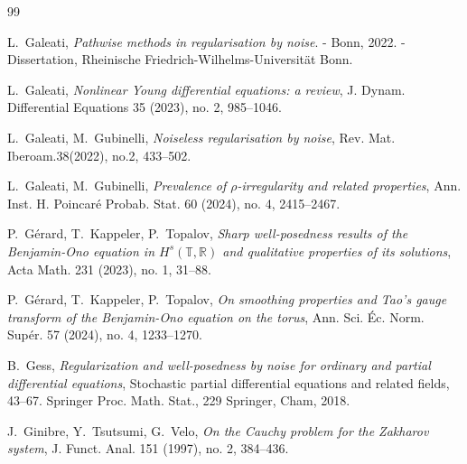 \documentclass[letterpaper, 11pt,  reqno]{amsart}
\newcommand{\1}{\hspace{0.5mm}\text{I}\hspace{0.5mm}}
\newcommand{\R}{\mathbb{R}}
\newcommand{\T}{\mathbb{T}}
\numberwithin{equation}{section}
\numberwithin{theorem}{section}
\begin{document}
\begin{thebibliography}{99}
%
%

L.~Galeati, 
{\it Pathwise methods in regularisation by noise}. - Bonn, 2022. - Dissertation, 
Rheinische Friedrich-Wilhelms-Universit\"at Bonn. 

L.~Galeati, 
{\it Nonlinear {Y}oung differential equations: a review}, 
J. Dynam. Differential Equations 35 (2023), no. 2, 985--1046.



L.~Galeati, M.~Gubinelli,
{\it Noiseless regularisation by noise}, 
Rev. Mat. Iberoam.38(2022), no.2, 433--502.




L.~Galeati, M.~Gubinelli,
{\it  Prevalence of $\rho$-irregularity and related properties},
 Ann. Inst. H. Poincar\'e Probab. Stat.
 60 (2024), no. 4, 2415--2467.



%
%
%



P.~G\'erard, T.~Kappeler, P.~Topalov,
{\it  Sharp well-posedness results of the Benjamin-Ono equation in $H^s(\T, \R)$  and qualitative properties of its solutions}, 
Acta Math. 231 (2023), no. 1,  31--88.



P.~G\'erard, T.~Kappeler, P.~Topalov,
{\it On smoothing properties and Tao's gauge transform of the Benjamin-Ono equation on the torus},
 Ann. Sci. \'Ec. Norm. Sup\'er.  57 (2024), no. 4, 1233--1270.



B.~Gess, 
{\it Regularization and well-posedness by noise for ordinary and partial differential equations},
 Stochastic partial differential equations and related fields, 43--67. Springer Proc. Math. Stat., 229
Springer, Cham, 2018.




J.~Ginibre, Y.~Tsutsumi, G.~Velo, 
{\it On the Cauchy problem for the Zakharov system}, 
J. Funct. Anal. 151 (1997), no. 2, 384--436.

%
%


\end{thebibliography}
\end{document}
